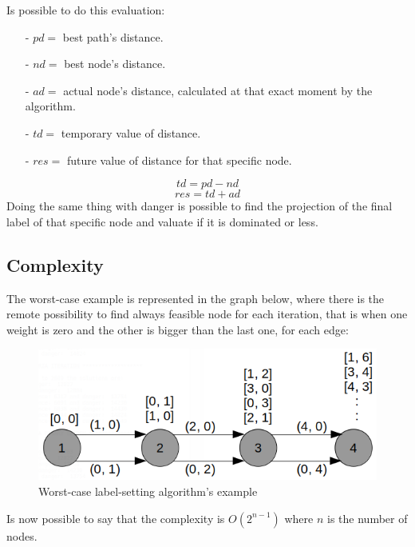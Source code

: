 \documentclass[a4paper,11pt]{report}
\begin{document}
Is possible to do this evaluation:
\begin{itemize}
	\item[-] $pd =$ best path's distance.
	\item[-] $nd =$ best node's distance.
	\item[-] $ad =$ actual node's distance, calculated at that exact moment by the algorithm.
	\item[-] $td =$ temporary value of distance.
	\item[-] $res =$ future value of distance for that specific node.
\end{itemize}
$$ td = pd - nd$$
$$res = td + ad$$
Doing the same thing with danger is possible to find the projection of the final label of that specific node and valuate if it is dominated or less.
\subsection{Complexity}
The worst-case example is represented in the graph below, where there is the remote possibility to find always feasible node for each iteration, that is when one weight is zero and the other is bigger than the last one, for each edge:

\begin{figure}[h]
	\centering
	\includegraphics[width=\linewidth]{img/labelSettingComplexity.png}
	\caption{Worst-case label-setting algorithm's example}
	\label{fig:worstCaseLabelSettin}
\end{figure}
Is now possible to say that the complexity is $O(2^{n-1})$ where $n$ is the number of nodes. 
\end{document}

